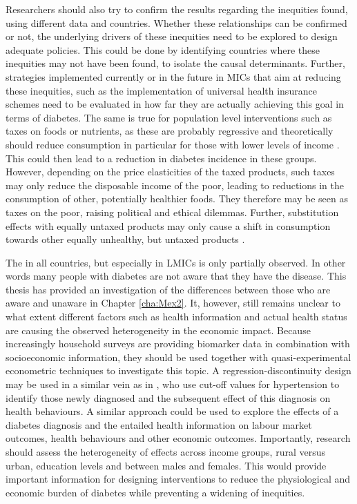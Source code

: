 Researchers should also try to confirm the results regarding the inequities found, using different data and countries. Whether these relationships can be confirmed or not, the underlying drivers of these inequities need to be explored to design adequate policies. This could be done by identifying countries where these inequities may not have been found, to isolate the causal determinants. Further, strategies implemented currently or in the future in \acp{MIC} that aim at reducing these inequities, such as the implementation of universal health insurance schemes need to be evaluated in how far they are actually achieving this goal in terms of diabetes. The same is true for population level interventions such as taxes on foods or nutrients, as these are probably regressive and theoretically should reduce consumption in particular for those with lower levels of income \parencite{Mytton2012c}. This could then lead to a reduction in diabetes incidence in these groups. However, depending on the price elasticities of the taxed products, such taxes may only reduce the disposable income of the poor, leading to reductions in the consumption of other, potentially healthier foods. They therefore may be seen as taxes on the poor, raising political and ethical dilemmas. Further, substitution effects with equally untaxed products may only cause a shift in consumption towards other equally unhealthy, but untaxed products \parencite{Mytton2012c}.

The \DIFdelbegin {}\DIFdelend \DIFaddbegin {}\DIFaddend in all countries, but especially in \acp{LMIC} is only partially observed. In other words many people with diabetes are not aware that they have the disease. This thesis has provided an investigation of the differences between those who are aware and unaware in Chapter \ref{cha:Mex2}. It, however, still remains unclear to what extent different factors such as health information and actual health status are causing the observed heterogeneity in the economic impact. Because increasingly household surveys are providing biomarker data in combination with socioeconomic information, they should be used together with quasi-experimental econometric techniques to investigate this topic. A regression-discontinuity design may be used in a similar vein as in \textcite{Zhao2013a}, who use cut-off values for hypertension to identify those newly diagnosed and the subsequent effect of this diagnosis on health behaviours. A similar approach could be used to explore the effects of a diabetes diagnosis and the entailed health information on labour market outcomes, health behaviours and other economic outcomes. Importantly, research should assess the heterogeneity of effects across income groups, rural versus urban, education levels and between males and females. This would provide important information for designing interventions to reduce the physiological and economic burden of diabetes while preventing a widening of inequities.

